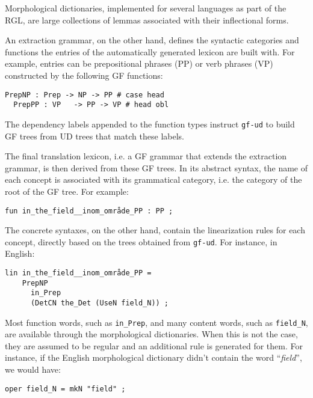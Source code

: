 \documentclass[11pt]{article}
\begin{document}
Morphological dictionaries, implemented for several languages as part of the RGL, are large collections of lemmas associated with their inflectional forms. 

An extraction grammar, on the other hand, defines the syntactic categories and functions the entries of the automatically generated lexicon are built with.
For example, entries can be prepositional phrases (PP) or verb phrases (VP) constructed by the following GF functions:

\begin{Verbatim}[fontsize=\small]
  PrepNP : Prep -> NP -> PP # case head
  PrepPP : VP   -> PP -> VP # head obl
\end{Verbatim}

The dependency labels appended to the function types instruct \texttt{gf-ud} to build GF trees from UD trees that match these labels. 

The final translation lexicon, i.e. a GF grammar that extends the extraction grammar, is then derived from these GF trees. 
In its abstract syntax, the name of each concept is associated with its grammatical category, i.e. the category of the root of the GF tree.
For example:

\begin{Verbatim}[fontsize=\small]
  fun in_the_field__inom_område_PP : PP ;
\end{Verbatim}

The concrete syntaxes, on the other hand, contain the linearization rules for each concept, directly based on the trees obtained from \texttt{gf-ud}. 
For instance, in English:

\begin{Verbatim}[fontsize=\small]
  lin in_the_field__inom_område_PP = 
    PrepNP 
      in_Prep 
      (DetCN the_Det (UseN field_N)) ;
\end{Verbatim}

Most function words, such as \texttt{in\_Prep}, and many content words, such as \texttt{field\_N}, are available through the morphological dictionaries.
When this is not the case, they are assumed to be regular and an additional rule is generated for them. 
For instance, if the English morphological dictionary didn't contain the word ``\textit{field}'', we would have:

\begin{Verbatim}[fontsize=\small]
  oper field_N = mkN "field" ;
\end{Verbatim}
\end{document}
